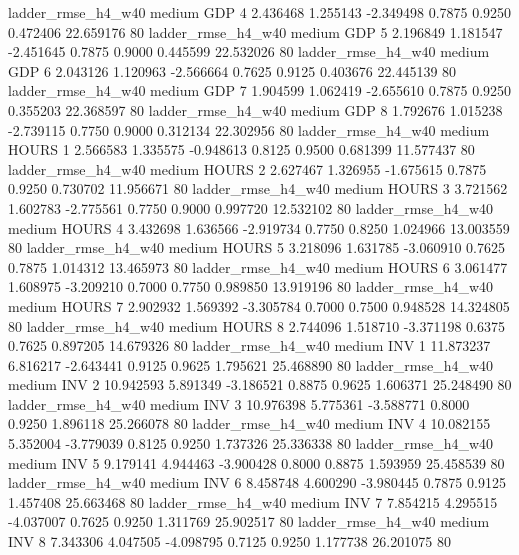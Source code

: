     ladder_rmse_h4_w40     medium      GDP                 4  2.436468 1.255143 -2.349498 0.7875 0.9250  0.472406   22.659176 80
    ladder_rmse_h4_w40     medium      GDP                 5  2.196849 1.181547 -2.451645 0.7875 0.9000  0.445599   22.532026 80
    ladder_rmse_h4_w40     medium      GDP                 6  2.043126 1.120963 -2.566664 0.7625 0.9125  0.403676   22.445139 80
    ladder_rmse_h4_w40     medium      GDP                 7  1.904599 1.062419 -2.655610 0.7875 0.9250  0.355203   22.368597 80
    ladder_rmse_h4_w40     medium      GDP                 8  1.792676 1.015238 -2.739115 0.7750 0.9000  0.312134   22.302956 80
    ladder_rmse_h4_w40     medium    HOURS                 1  2.566583 1.335575 -0.948613 0.8125 0.9500  0.681399   11.577437 80
    ladder_rmse_h4_w40     medium    HOURS                 2  2.627467 1.326955 -1.675615 0.7875 0.9250  0.730702   11.956671 80
    ladder_rmse_h4_w40     medium    HOURS                 3  3.721562 1.602783 -2.775561 0.7750 0.9000  0.997720   12.532102 80
    ladder_rmse_h4_w40     medium    HOURS                 4  3.432698 1.636566 -2.919734 0.7750 0.8250  1.024966   13.003559 80
    ladder_rmse_h4_w40     medium    HOURS                 5  3.218096 1.631785 -3.060910 0.7625 0.7875  1.014312   13.465973 80
    ladder_rmse_h4_w40     medium    HOURS                 6  3.061477 1.608975 -3.209210 0.7000 0.7750  0.989850   13.919196 80
    ladder_rmse_h4_w40     medium    HOURS                 7  2.902932 1.569392 -3.305784 0.7000 0.7500  0.948528   14.324805 80
    ladder_rmse_h4_w40     medium    HOURS                 8  2.744096 1.518710 -3.371198 0.6375 0.7625  0.897205   14.679326 80
    ladder_rmse_h4_w40     medium      INV                 1 11.873237 6.816217 -2.643441 0.9125 0.9625  1.795621   25.468890 80
    ladder_rmse_h4_w40     medium      INV                 2 10.942593 5.891349 -3.186521 0.8875 0.9625  1.606371   25.248490 80
    ladder_rmse_h4_w40     medium      INV                 3 10.976398 5.775361 -3.588771 0.8000 0.9250  1.896118   25.266078 80
    ladder_rmse_h4_w40     medium      INV                 4 10.082155 5.352004 -3.779039 0.8125 0.9250  1.737326   25.336338 80
    ladder_rmse_h4_w40     medium      INV                 5  9.179141 4.944463 -3.900428 0.8000 0.8875  1.593959   25.458539 80
    ladder_rmse_h4_w40     medium      INV                 6  8.458748 4.600290 -3.980445 0.7875 0.9125  1.457408   25.663468 80
    ladder_rmse_h4_w40     medium      INV                 7  7.854215 4.295515 -4.037007 0.7625 0.9250  1.311769   25.902517 80
    ladder_rmse_h4_w40     medium      INV                 8  7.343306 4.047505 -4.098795 0.7125 0.9250  1.177738   26.201075 80
